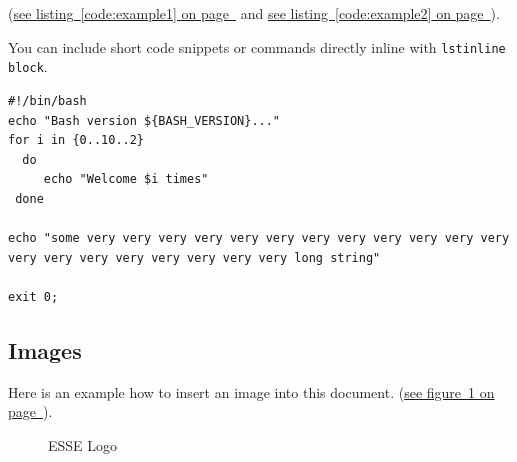 \documentclass[12pt,a4paper,titlepage,oneside]{scrartcl}
\begin{document}
(\hyperref[code:example1]{see listing~\ref*{code:example1} on page~\pageref*{code:example1}} and \hyperref[code:example2]{see listing~\ref*{code:example2} on page~\pageref*{code:example2}}).

You can include short code snippets or commands directly inline with \lstinline{lstinline block}.



\begin{lstlisting}[caption=Example bash script,label=code:example2,style=simple]
#!/bin/bash
echo "Bash version ${BASH_VERSION}..."
for i in {0..10..2}
  do
     echo "Welcome $i times"
 done

echo "some very very very very very very very very very very very very very very very very very very very very long string"

exit 0;
\end{lstlisting}

\subsection{Images}

Here is an example how to insert an image into this document.
(\hyperref[fig:logo1]{see figure~\ref*{fig:logo1} on page~\pageref*{fig:logo1}}).

\begin{figure}[h!]
  \centering
  \caption{ESSE Logo}
  \label{fig:logo1}
\end{figure}


%
%
\end{document}
